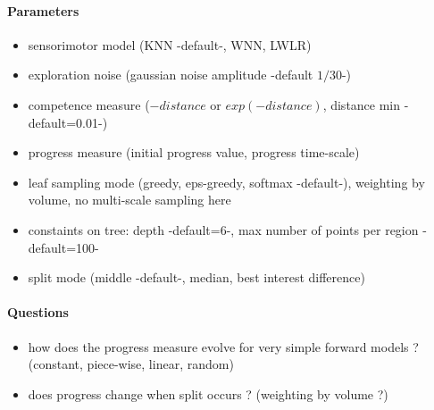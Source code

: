 \documentclass[12pt]{article}
\begin{document}
		\paragraph{Parameters}
		\begin{itemize}
			\item sensorimotor model (KNN -default-, WNN, LWLR)
			\item exploration noise (gaussian noise amplitude -default $1/30$-)
			\item competence measure ($-distance$ or $exp(-distance)$, distance min -default=0.01-)
			\item progress measure (initial progress value, progress time-scale)
			\item leaf sampling mode (greedy, eps-greedy, softmax -default-), weighting by volume, no multi-scale sampling here
			\item constaints on tree: depth -default=6-, max number of points per region -default=100-
			\item split mode (middle -default-, median, best interest difference)
		
		\end{itemize}
		
		
		\paragraph{Questions}
		\begin{itemize}
	
			\item how does the progress measure evolve for very simple forward models ? (constant, piece-wise, linear, random)
			\item does progress change when split occurs ? (weighting by volume ?)
		
		\end{itemize}
	
\end{document}

